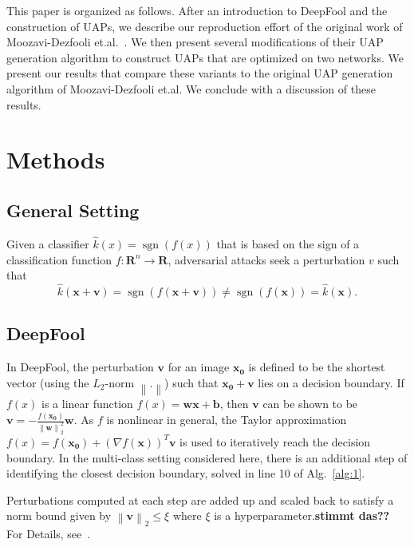 \documentclass[runningheads]{llncs}
\DeclareMathOperator{\sgn}{sgn}
\newcommand{\xn}{\ensuremath{\mathbf{x_0}}}
\begin{document}
This paper is organized as follows. After an introduction to DeepFool and the construction of UAPs, we describe our reproduction effort of the original work of Moozavi-Dezfooli et.al.~\cite{moosavi-dezfooli_universal_2017}. We then present several modifications of their UAP generation algorithm to construct UAPs that are optimized on two networks. We present our results that compare these variants to the original UAP generation algorithm of Moozavi-Dezfooli et.al. We conclude with a discussion of these results.

\section{Methods}
\subsection{General Setting}
Given a classifier $\hat{k}(x)=\sgn\left(f(x)\right)$ that is based on the sign of a classification function $f:\mathbf{R}^n\rightarrow\mathbf{R}$, adversarial attacks seek a perturbation $v$ such that \[\hat{k}(\mathbf{x}+\mathbf{v})=\sgn\left(f(\mathbf{x}+\mathbf{v})\right)\neq \sgn\left(f(\mathbf{x})\right)=\hat{k}(\mathbf{x}).\] 


\subsection{DeepFool}
In DeepFool, the perturbation $\mathbf{v}$ for an image $\xn$ is defined to be the shortest vector (using the $L_2$-norm $\left\|.\right\|$) such that $\xn+\mathbf{v}$ lies on a decision boundary. 
If $f(x)$ is a linear function $f(x)=\mathbf{w} \mathbf{x}+\mathbf{b}$, then $\mathbf{v}$ can be shown to be $\mathbf{v}=-\frac{f(\xn)}{\left\|\mathbf{w}\right\|_2^2}\mathbf{w}$. As $f$ is nonlinear in general, the Taylor approximation $f(x)=f(\xn)+\left(\nabla f(\mathbf{x})\right)^T\mathbf{v}$ is used to iteratively reach the decision boundary. 
In the multi-class setting considered here, there is an additional step of identifying the closest decision boundary, solved in line 10 of Alg.~\ref{alg:1}.

Perturbations computed at each step are added up and scaled back to satisfy a norm bound given by \(\left\|\mathbf{v}\right\|_2\leq\xi\) where \(\xi\) is a hyperparameter.{\bf stimmt das??} For Details, see~\cite{DeepFool-Moosavi-Dezfooli15}. \\
\end{document}
